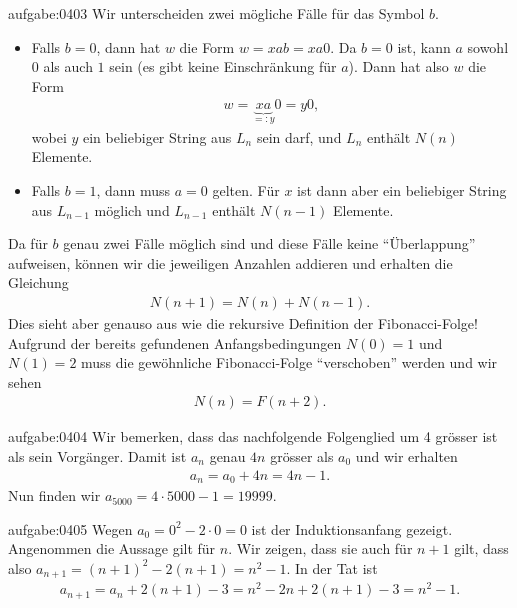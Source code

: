 \begin{antwort}{aufgabe:0403}
    Wir unterscheiden zwei mögliche Fälle für das Symbol $b$.
    \begin{itemize}
        \item Falls $b = 0$, dann hat $w$ die Form $w = xab = xa0$. Da $b = 0$ ist, kann $a$ sowohl $0$ als auch $1$ sein (es gibt keine Einschränkung für $a$). Dann hat also $w$ die Form
        \begin{align*}
            w = \underbrace{xa}_{=:y}0 = y0,
        \end{align*}
        wobei $y$ ein beliebiger String aus $L_n$ sein darf, und $L_n$ enthält $N(n)$ Elemente.
        \item  Falls $b = 1$, dann muss $a = 0$ gelten. Für $x$ ist dann aber ein beliebiger String aus $L_{n-1}$ möglich und $L_{n-1}$ enthält $N(n-1)$ Elemente.
    \end{itemize}
    Da für $b$ genau zwei Fälle möglich sind und diese Fälle keine \enquote{Überlappung} aufweisen, können wir die jeweiligen Anzahlen addieren und erhalten die Gleichung
    \begin{align}\label{eq:rekkurenz}
        N(n+1) = N(n) + N(n-1).
    \end{align}
    Dies sieht aber genauso aus wie die rekursive Definition der Fibonacci-Folge! Aufgrund der bereits gefundenen Anfangsbedingungen $N(0) = 1$ und $N(1) = 2$ muss die gewöhnliche Fibonacci-Folge \enquote{verschoben} werden und wir sehen
    \begin{align*}
        N(n) = F(n+2).
    \end{align*}
\end{antwort}


\begin{antwort}{aufgabe:0404}
Wir bemerken, dass das nachfolgende Folgenglied um 4 grösser ist als sein Vorgänger. Damit ist $a_n$ genau $4n$ grösser als $a_0$ und wir erhalten
\begin{align*}
    a_n = a_0 + 4n = 4n - 1.
\end{align*}
Nun finden wir $a_{5000} = 4\cdot 5000 - 1 = 19999$.
\end{antwort}



\begin{antwort}{aufgabe:0405}
Wegen $a_0 = 0^2 - 2\cdot 0 = 0$ ist der Induktionsanfang gezeigt. Angenommen die Aussage gilt für $n$. Wir zeigen, dass sie auch für $n+1$ gilt, dass also $a_{n+1} = (n+1)^2 - 2(n+1) = n^2 - 1$. In der Tat ist
\begin{align*}
    a_{n+1} = a_n + 2(n+1) - 3 = n^2 - 2n + 2(n+1) - 3 = n^2 - 1.
\end{align*}
\end{antwort}


